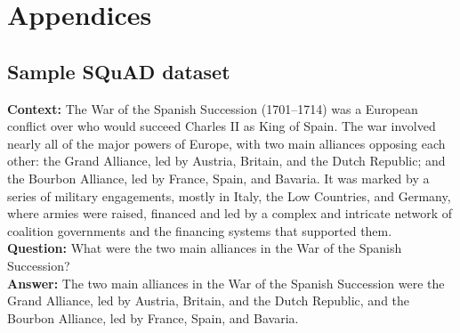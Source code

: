 \documentclass[12pt]{report}
\begin{document}
\chapter{Appendices}
\section{Sample SQuAD dataset}
{\bfseries Context:}
The War of the Spanish Succession (1701–1714) was a European conflict over who would succeed Charles II as King of Spain. The war involved nearly all of the major powers of Europe, with two main alliances opposing each other: the Grand Alliance, led by Austria, Britain, and the Dutch Republic; and the Bourbon Alliance, led by France, Spain, and Bavaria. It was marked by a series of military engagements, mostly in Italy, the Low Countries, and Germany, where armies were raised, financed and led by a complex and intricate network of coalition governments and the financing systems that supported them.\\
{\bfseries Question:}
What were the two main alliances in the War of the Spanish Succession?\\
{\bfseries Answer:}
The two main alliances in the War of the Spanish Succession were the Grand Alliance, led by Austria, Britain, and the Dutch Republic, and the Bourbon Alliance, led by France, Spain, and Bavaria.
\end{document}

